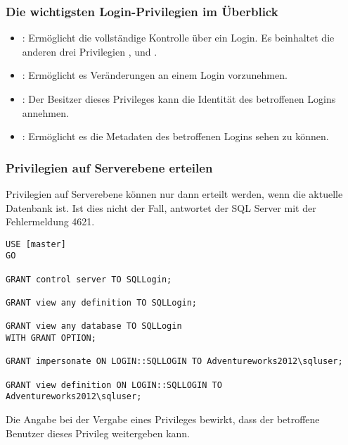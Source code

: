         \subsubsection{Die wichtigsten Login-Privilegien im Überblick}
          \begin{itemize}
            \item {}: Ermöglicht die vollständige Kontrolle über
            ein Login. Es beinhaltet die anderen drei Privilegien
            ,  und .
            \item {}: Ermöglicht es Veränderungen an einem Login
            vorzunehmen.
            \item {}: Der Besitzer dieses Privileges kann
            die Identität des betroffenen Logins annehmen.
            \item {}: Ermöglicht es die Metadaten des
            betroffenen Logins sehen zu können.
          \end{itemize}
        \subsubsection{Privilegien auf Serverebene erteilen}
          \begin{merke}
            Privilegien auf Serverebene können nur dann erteilt werden, wenn die
            aktuelle Datenbank  ist. Ist dies nicht der Fall,
            antwortet der SQL Server mit der Fehlermeldung 4621.
          \end{merke}
          \begin{lstlisting}[language=ms_sql, caption={Privilegien auf
          ein Server- oder Login-Objekt erteilen}, label=admin19_05]
USE [master]
GO

GRANT control server TO SQLLogin;

GRANT view any definition TO SQLLogin;

GRANT view any database TO SQLLogin
WITH GRANT OPTION;

GRANT impersonate ON LOGIN::SQLLOGIN TO Adventureworks2012\sqluser;

GRANT view definition ON LOGIN::SQLLOGIN TO Adventureworks2012\sqluser;
          \end{lstlisting}
          Die Angabe  bei der Vergabe eines
          Privileges bewirkt, dass der betroffene Benutzer dieses Privileg
          weitergeben kann.
          \begin{literaturinternet}
            \item \cite{ms178640}
            \item \cite{ms186717}
          \end{literaturinternet}
